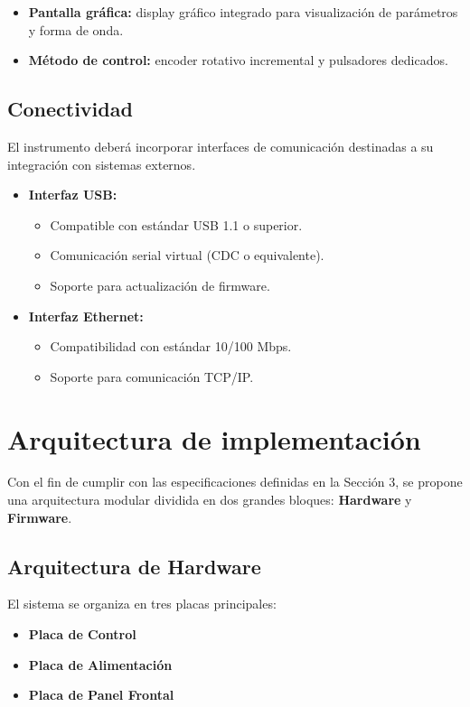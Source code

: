 \begin{itemize}
	\item \textbf{Pantalla gráfica:} display gráfico integrado para visualización de parámetros y forma de onda.
	\item \textbf{Método de control:} encoder rotativo incremental y pulsadores dedicados.
\end{itemize}

\subsection{Conectividad}

El instrumento deberá incorporar interfaces de comunicación destinadas a su integración con sistemas externos.

\begin{itemize}
	\item \textbf{Interfaz USB:}
	\begin{itemize}[label=\textbullet]
		\item Compatible con estándar USB 1.1 o superior.
		\item Comunicación serial virtual (CDC o equivalente).
		\item Soporte para actualización de firmware.
	\end{itemize}
	
	\item \textbf{Interfaz Ethernet:}
	\begin{itemize}[label=\textbullet]
		\item Compatibilidad con estándar 10/100 Mbps.
		\item Soporte para comunicación TCP/IP.
	\end{itemize}
\end{itemize}

\section{Arquitectura de implementación}
Con el fin de cumplir con las especificaciones definidas en la Sección 3, se propone una arquitectura modular dividida en dos grandes bloques: \textbf{Hardware} y \textbf{Firmware}.

\subsection{Arquitectura de Hardware}
El sistema se organiza en tres placas principales:

\begin{itemize}
	\item \textbf{Placa de Control}
	\item \textbf{Placa de Alimentación}
	\item \textbf{Placa de Panel Frontal}
\end{itemize}

